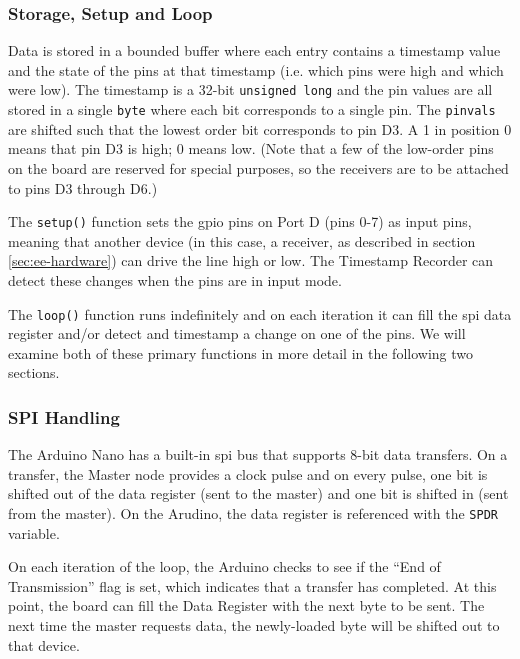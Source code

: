 \documentclass[12pt]{article}
\begin{document}
\subsubsection{Storage, Setup and Loop}

Data is stored in a bounded buffer where each entry contains a timestamp value
and the state of the pins at that timestamp (i.e. which pins were high and
which were low).
The timestamp is a 32-bit \texttt{unsigned long} and the pin values are
all stored in a single \texttt{byte} where each bit corresponds to a single
pin.
The \texttt{pinvals} are shifted such that the lowest order bit corresponds
to pin D3.
A 1 in position 0 means that pin D3 is high; 0 means low.
(Note that a few of the low-order pins on the board are reserved for special
purposes, so the receivers are to be attached to pins D3 through D6.)

The \texttt{setup()} function sets the \gls{gpio} pins on Port D (pins 0-7)
as input pins, meaning that another device (in this case, a receiver, as
described in section \ref{sec:ee-hardware}) can drive the line high or low.
The Timestamp Recorder can detect these changes when the pins are in input
mode.

The \texttt{loop()} function runs indefinitely and on each iteration it can fill
the \gls{spi} data register and/or detect and timestamp a change on one of the
pins.
We will examine both of these primary functions in more detail in the following
two sections.

\subsubsection{SPI Handling}

The Arduino Nano has a built-in \gls{spi} bus that supports 8-bit data
transfers.
On a transfer, the Master node provides a clock pulse and on every pulse, one
bit is shifted out of the data register (sent to the master) and one bit is
shifted in (sent from the master).
On the Arudino, the data register is referenced with the \texttt{SPDR}
variable.

On each iteration of the loop, the Arduino checks to see if the ``End of
Transmission'' flag is set, which indicates that a transfer has completed.
At this point, the board can fill the Data Register with the next byte to be
sent.
The next time the master requests data, the newly-loaded byte will be shifted
out to that device.
\end{document}
